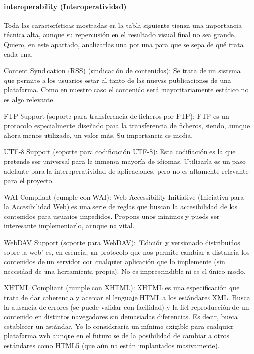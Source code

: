 \paragraph{interoperability (Interoperatividad)}

\par Toda las características mostradas en la tabla siguiente tienen una importancia técnica alta, aunque su repercusión en el resultado visual final no sea grande. Quiero, en este apartado, analizarlas una por una para que se sepa de qué trata cada una.

\par Content Syndication (RSS) (sindicación de contenidos): Se trata de un sistema que permite a los usuarios estar al tanto de las nuevas publicaciones de una plataforma. Como en nuestro caso el contenido será mayoritariamente estático no es algo relevante.

\par FTP Support (soporte para transferencia de ficheros por FTP): FTP es un protocolo especialmente diseñado para la transferencia de ficheros, siendo, aunque ahora menos utilizado, un valor más. Su importancia es media.

\par UTF-8 Support (soporte para codificación UTF-8): Esta codifiación es la que pretende ser universal para la inmensa mayoría de idiomas. Utilizarla es un paso adelante para la interoperatividad de aplicaciones, pero no es altamente relevante para el proyecto.

\par WAI Compliant (cumple con WAI): Web Accessibility Initiative (Iniciativa para la Accesibilidad Web) es una serie de reglas que buscan la accesibilidad de los contenidos para usuarios impedidos. Propone unos mínimos y puede ser interesante implementarlo, aunque no vital.

\par WebDAV Support (soporte para WebDAV): "Edición y versionado distribuidos sobre la web" es, en esencia, un protocolo que nos permite cambiar a distancia los contenidos de un servidor con cualquier aplicación que lo implemente (sin necesidad de una herramienta propia). No es imprescindible ni es el único modo.

\par XHTML Compliant (cumple con XHTML): XHTML es una especificación que trata de dar coherencia y acercar el lenguaje HTML a los estándares XML. Busca la ausencia de errores (se puede validar con facilidad) y la fiel reproducción de un contenido en distintos navegadores sin demasiadas diferencias. Es decir, busca establecer un estándar. Yo lo consideraría un mínimo exigible para cualquier plataforma web aunque en el futuro se de la posibilidad de cambiar a otros estándares como HTML5 (que aún no están implantados masivamente).



